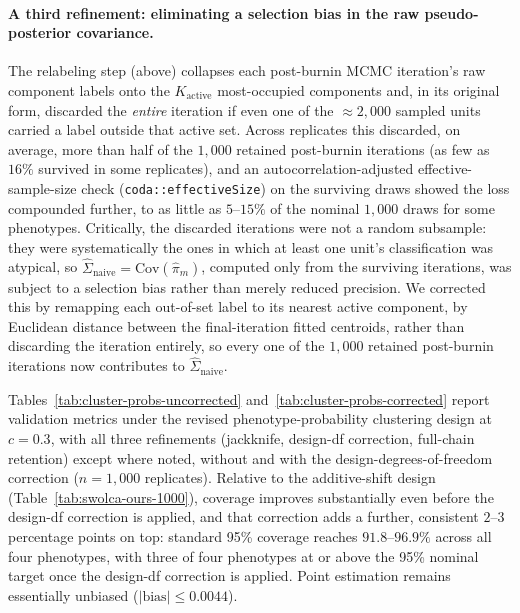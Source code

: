 \documentclass[11pt]{article}
\begin{document}
\paragraph{A third refinement: eliminating a selection bias in the raw pseudo-posterior covariance.} The relabeling step (above) collapses each post-burnin MCMC iteration's raw component labels onto the $K_{\text{active}}$ most-occupied components and, in its original form, discarded the \emph{entire} iteration if even one of the $\approx 2{,}000$ sampled units carried a label outside that active set. Across replicates this discarded, on average, more than half of the $1{,}000$ retained post-burnin iterations (as few as $16\%$ survived in some replicates), and an autocorrelation-adjusted effective-sample-size check (\texttt{coda::effectiveSize}) on the surviving draws showed the loss compounded further, to as little as $5$--$15\%$ of the nominal $1{,}000$ draws for some phenotypes. Critically, the discarded iterations were not a random subsample: they were systematically the ones in which at least one unit's classification was atypical, so $\hat\Sigma_{\text{naive}} = \text{Cov}(\hat\pi_m)$, computed only from the surviving iterations, was subject to a selection bias rather than merely reduced precision. We corrected this by remapping each out-of-set label to its nearest active component, by Euclidean distance between the final-iteration fitted centroids, rather than discarding the iteration entirely, so every one of the $1{,}000$ retained post-burnin iterations now contributes to $\hat\Sigma_{\text{naive}}$.

Tables~\ref{tab:cluster-probs-uncorrected} and~\ref{tab:cluster-probs-corrected} report validation metrics under the revised phenotype-probability clustering design at $c=0.3$, with all three refinements (jackknife, design-df correction, full-chain retention) except where noted, without and with the design-degrees-of-freedom correction ($n=1{,}000$ replicates). Relative to the additive-shift design (Table~\ref{tab:swolca-ours-1000}), coverage improves substantially even before the design-df correction is applied, and that correction adds a further, consistent $2$--$3$ percentage points on top: standard 95\% coverage reaches $91.8$--$96.9\%$ across all four phenotypes, with three of four phenotypes at or above the 95\% nominal target once the design-df correction is applied. Point estimation remains essentially unbiased ($|\text{bias}| \le 0.0044$).
\end{document}
